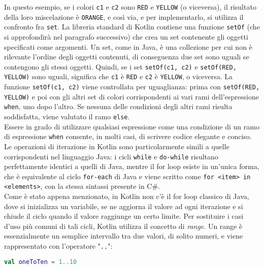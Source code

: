 In questo esempio, se i colori \texttt{c1} e \texttt{c2} sono \texttt{RED} e \texttt{YELLOW} (o viceversa), il risultato della loro miscelazione è \texttt{ORANGE}, e così via, e per implementarlo, si utilizza il confronto fra \texttt{set}. La libreria standard di Kotlin contiene una funzione \texttt{setOf} (che si approfondirà nel paragrafo successivo) che crea un set contenente gli oggetti specificati come argomenti. Un set, come in Java, è una collezione per cui non è rilevante l'ordine degli oggetti contenuti, di conseguenza due set sono uguali se contengono gli stessi oggetti. Quindi, se i set \texttt{setOf(c1, c2)} e \texttt{setOf(RED, YELLOW)} sono uguali, significa che \texttt{c1} è \texttt{RED} e \texttt{c2} è \texttt{YELLOW}, o viceversa. La funzione \texttt{setOf(c1, c2)} viene controllata per uguaglianza: prima con \texttt{setOf(RED, YELLOW)} e poi con gli altri set di colori corrispondenti ai vari rami dell’espressione \texttt{when}, uno dopo l'altro. Se nessuna delle condizioni degli altri rami risulta soddisfatta, viene valutato il ramo \texttt{else}.\\
Essere in grado di utilizzare qualsiasi espressione come una condizione di un ramo di espressione \texttt{when} consente, in molti casi, di scrivere codice elegante e conciso.\\
Le operazioni di iterazione in Kotlin sono particolarmente simili a quelle corrispondenti nel linguaggio Java: i cicli \texttt{while} e \texttt{do-while} risultano perfettamente identici a quelli di Java, mentre il for loop esiste in un’unica forma, che è equivalente al ciclo \texttt{for-each} di Java e viene scritto come \texttt{for <item> in <elements>}, con la stessa sintassi presente in C\#.\\
Come è stato appena menzionato, in Kotlin non c'è il for loop classico di Java, dove si inizializza un variabile, se ne aggiorna il valore ad ogni iterazione e si chiude il ciclo quando il valore raggiunge un certo limite. Per sostituire i casi d’uso più comuni di tali cicli, Kotlin utilizza il concetto di {\em range}. Un range è essenzialmente un semplice intervallo tra due valori, di solito numeri, e viene rappresentato con l’operatore "\texttt{..}":\\

\begin{lstlisting}[caption={Utilizzo dell'operatore di range}, captionpos=b, label={lst:exampleRange}, language=Kotlin]
val oneToTen = 1..10
\end{lstlisting}

